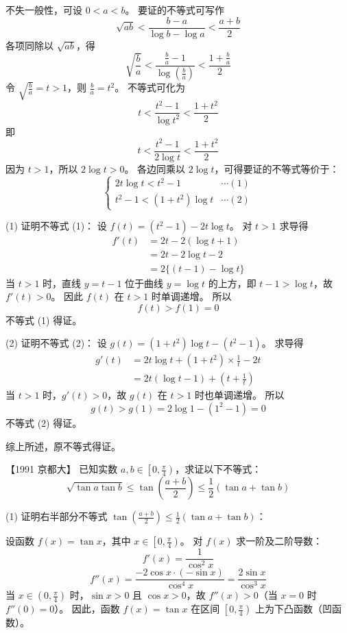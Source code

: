 \begin{questions}
\begin{solution}
不失一般性，可设 $0 < a < b$。
要证的不等式可写作
\[
\sqrt{ab} < \frac{b-a}{\log b - \log a} < \frac{a+b}{2}
\]
各项同除以 $\sqrt{ab}$，得
\[
\sqrt{\frac{b}{a}} < \frac{\frac{b}{a}-1}{\log\left(\frac{b}{a}\right)} < \frac{1+\frac{b}{a}}{2}
\]
令 $\sqrt{\frac{b}{a}} = t > 1$，则 $\frac{b}{a} = t^2$。
不等式可化为
\[
t < \frac{t^2-1}{\log t^2} < \frac{1+t^2}{2}
\]
即
\[
t < \frac{t^2-1}{2\log t} < \frac{1+t^2}{2}
\]
因为 $t > 1$，所以 $2\log t > 0$。
各边同乘以 $2\log t$，可得要证的不等式等价于：
\[
\begin{cases}
2t\log t < t^2 - 1 & \cdots (1) \\
t^2 - 1 < (1+t^2)\log t & \cdots (2)
\end{cases}
\]

(1) 证明不等式 (1)：
设 $f(t) = (t^2-1) - 2t\log t$。
对 $t > 1$ 求导得
\begin{align*}
f'(t) &= 2t - 2(\log t + 1) \\
&= 2t - 2\log t - 2 \\
&= 2\{(t-1) - \log t\}
\end{align*}
当 $t > 1$ 时，直线 $y = t - 1$ 位于曲线 $y = \log t$ 的上方，即 $t - 1 > \log t$，故 $f'(t) > 0$。
因此 $f(t)$ 在 $t > 1$ 时单调递增。
所以
\[
f(t) > f(1) = 0
\]
不等式 (1) 得证。

(2) 证明不等式 (2)：
设 $g(t) = (1+t^2)\log t - (t^2-1)$。
求导得
\begin{align*}
g'(t) &= 2t\log t + (1+t^2) \times \frac{1}{t} - 2t \\
&= 2t(\log t - 1) + \left(t + \frac{1}{t}\right)
\end{align*}
当 $t > 1$ 时，$g'(t) > 0$，故 $g(t)$ 在 $t > 1$ 时也单调递增。
所以
\[
g(t) > g(1) = 2\log 1 - (1^2 - 1) = 0
\]
不等式 (2) 得证。

综上所述，原不等式得证。
\end{solution}

\question
【1991 京都大】
已知实数 $a, b \in \left[0, \frac{\pi}{4}\right)$，求证以下不等式：
\[
\sqrt{\tan a \tan b} \le \tan\left(\frac{a+b}{2}\right) \le \frac{1}{2}(\tan a + \tan b)
\]

\begin{solution}
(1) 证明右半部分不等式 $\tan\left(\frac{a+b}{2}\right) \le \frac{1}{2}(\tan a + \tan b)$：

设函数 $f(x) = \tan x$，其中 $x \in \left[0, \frac{\pi}{4}\right)$。
对 $f(x)$ 求一阶及二阶导数：
\[
f'(x) = \frac{1}{\cos^2 x}
\]
\[
f''(x) = \frac{-2\cos x \cdot (-\sin x)}{\cos^4 x} = \frac{2\sin x}{\cos^3 x}
\]
当 $x \in \left(0, \frac{\pi}{4}\right)$ 时，$\sin x > 0$ 且 $\cos x > 0$，故 $f''(x) > 0$（当 $x = 0$ 时 $f''(0) = 0$）。
因此，函数 $f(x) = \tan x$ 在区间 $\left[0, \frac{\pi}{4}\right)$ 上为下凸函数（凹函数）。


\end{solution}
\end{questions}
